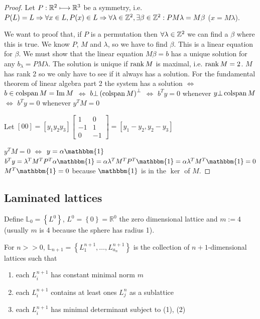 \begin{proof}
Let $P:\mathbb{R}^{2}\longmapsto\mathbb{R}^{3}$ be a symmetry, i.e. $P(L)=L\Rightarrow\forall x\in L, P(x)\in L \Rightarrow\forall\lambda\in\mathbb{Z}^{2}, \exists\beta\in\mathbb{Z}^{2}:PM\lambda=M\beta$ ($x=M\lambda$).

We want to proof that, if $P$ is a permutation then $\forall\lambda\in\mathbb{Z}^{2}$ we can find a $\beta$ where this is true.
We know $P$, $M$ and $\lambda$, so we have to find $\beta$. This is a linear equation for $\beta$.
We must show that the linear equation $M\beta=b$ has a unique solution for any $b_\lambda =PM\lambda$.
The solution is unique if $\operatorname{rank} M$ is maximal, i.e. $\operatorname{rank} M=2$.
$M$ has rank 2 so we only have to see if it always has a solution.
For the fundamental theorem of linear algebra part 2 the system has a solution $\Longleftrightarrow$ $b\in \operatorname{colspan} M=\operatorname{Im} M$ $\Longleftrightarrow$ $b\bot\left(\operatorname{colspan} M\right)^{\bot} $ $\Longleftrightarrow$ $b^{T}y=0$ whenever $y\bot \operatorname{colspan} M$ $\Longleftrightarrow$ $b^{T}y=0$ whenever $y^{T}M=0$

Let $\left[0 0\right]=\left[y_1 y_2 y_3\right]\left[\begin{smallmatrix}
1 & 0 \\
-1 & 1 \\
0 & -1\end{smallmatrix}\right]=\left[y_1 - y_2, y_2 - y_3\right]$

$y^{T}M=0$ $\Longleftrightarrow$ $y=\alpha\mathbbm{1}$
$b^{T}y=\lambda^{T}M^{T}P^{T}\alpha\mathbbm{1}=\alpha\lambda^{T}M^{T}P^{T}\mathbbm{1}=\alpha\lambda^{T}M^{T}\mathbbm{1}=0$
$M^{T}\mathbbm{1}=0$ because $\mathbbm{1}$ is in the $\ker$ of $M$.
\end{proof}


\subsection{Laminated lattices}


Define $\mathbb{L}_0=\left\{L^{0}\right\}$, $L^{0}=\left\{0\right\}=\mathbb{R}^{0}$ the zero dimensional lattice and $m:=4$ (usually $m$ is 4 because the sphere has radius 1).

For $n>>0$, $\mathbb{L}_{n+1}=\left\{L_1^{n+1},\ldots,L_{a_n}^{n+1}\right\}$ is the collection of $n+1$-dimensional lattices such that
\begin{enumerate}
\item each $L_i^{n+1}$ has constant minimal norm $m$
\item each $L_i^{n+1}$ contains at least ones $L_j^n$ as a sublattice
\item each $L_i^{n+1}$ has minimal determinant subject to (1), (2)
\end{enumerate}


